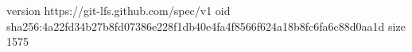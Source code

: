 version https://git-lfs.github.com/spec/v1
oid sha256:4a22fd34b27b8fd07386e228f1db40e4fa4f8566f624a18b8fc6fa6c88d0aa1d
size 1575
